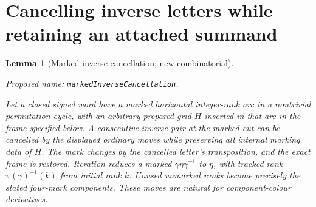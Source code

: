 \documentclass[11pt,a4paper]{article}
\newtheorem{lemma}[theorem]{Lemma}
\theoremstyle{remark}
\newcommand{\formalname}[1]{\leavevmode\par\noindent\textnormal{\small Proposed name: \texttt{#1}.}\par\smallskip}
\begin{document}
\section{Cancelling inverse letters while retaining an attached summand}

\begin{lemma}[Marked inverse cancellation; new combinatorial]
\label{lem:marked-cancellation}
\formalname{markedInverseCancellation}
Let a closed signed word have a marked horizontal integer-rank arc
in a nontrivial permutation cycle, with an arbitrary prepared grid
$H$ inserted in that arc in the frame specified below.  A consecutive
inverse pair at the marked cut can be cancelled by the displayed
ordinary moves while preserving all internal marking data of $H$.
The mark changes by the cancelled letter's transposition, and the
exact frame is restored.  Iteration reduces a marked
$\gamma\eta\gamma^{-1}$ to $\eta$, with tracked rank
$\pi(\gamma)^{-1}(k)$ from initial rank $k$.  Unused unmarked ranks
become precisely the stated four-mark components.  These moves
are natural for component-colour derivatives.
\end{lemma}
\end{document}
